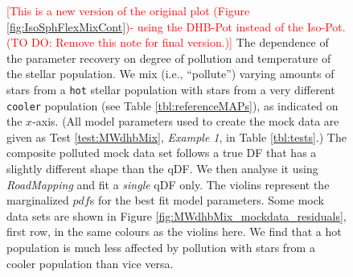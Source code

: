 \documentclass[iop,revtex4,numberedappendix,appendixfloats]{emulateapj}
\newcommand{\pdf}{\ensuremath{pdf}}
\newcommand{\RM}{{\sl RoadMapping}}
\newcommand{\NOTE}[1]{\textcolor{Red}{#1}}
\begin{document}
\begin{figure}[!htbp]
\caption{\NOTE{[This is a new version of the original plot (Figure \ref{fig:IsoSphFlexMixCont})- using the DHB-Pot instead of the Iso-Pot. (TO DO: Remove this note for final version.)]} The dependence of the parameter recovery on degree of pollution and temperature of the stellar population. We mix (i.e., ``pollute'') varying amounts of stars from a \texttt{hot} stellar population with stars from a very different \texttt{cooler} population (see Table \ref{tbl:referenceMAPs}), as indicated on the $x$-axis. (All model parameters used to create the mock data are given as Test \ref{test:MWdhbMix}, \emph{Example 1}, in Table \ref{tbl:tests}.) The composite polluted mock data set follows a true DF that has a slightly different shape than the qDF. We then analyse it using \RM{} and fit a \emph{single} qDF only. The violins represent the marginalized \pdf{}s for the best fit model parameters.  Some mock data sets are shown in Figure \ref{fig:MWdhbMix_mockdata_residuals}, first row, in the same colours as the violins here.  We find that a hot population is much less affected by pollution with stars from a cooler population than vice versa.}
\label{fig:MWdhbMixCont}
\end{figure}
\end{document}
